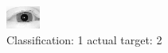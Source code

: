 \begin{figure}[h!]
\begin{center}
\includegraphics[width=0.60\columnwidth]{figures/ID3072_class_1_target_2.png}
\end{center}
\caption{ Classification: 1 actual target: 2}
\label{fig:ID3072_class_1_target_2}
\end{figure}
